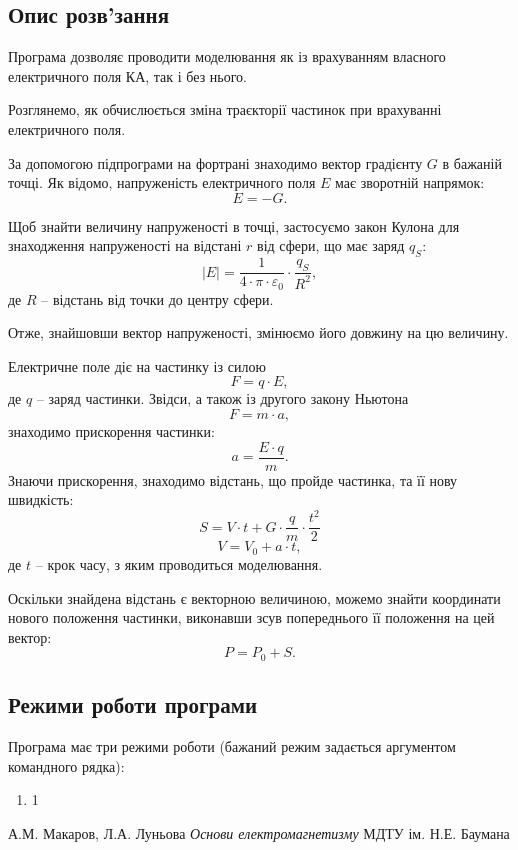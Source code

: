 \documentclass[a4paper,12pt]{article}
\begin{document}
\subsection{Опис розв’зання}
Програма дозволяє проводити моделювання як із врахуванням власного електричного поля КА, так і без нього.

Розглянемо, як обчислюється зміна траєкторії частинок при врахуванні електричного поля.

За допомогою підпрограми на фортрані знаходимо вектор градієнту $G$ в бажаній точці. Як відомо, напруженість електричного поля $E$ має зворотній напрямок:
\[
E = -G.
\]

Щоб знайти величину напруженості в точці, застосуємо закон Кулона для знаходження напруженості на відстані $r$ від сфери, що має заряд $q_S$:
\[
|E| = \frac{1}{4 \cdot \pi \cdot \varepsilon_0} \cdot \frac{q_S}{R^2},
\]
де $R$ -- відстань від точки до центру сфери.

Отже, знайшовши вектор напруженості, змінюємо його довжину на цю величину.

Електричне поле діє на частинку із силою
\[
F = q \cdot E,
\]
де $q$ -- заряд частинки.
Звідси, а також із другого закону Ньютона
\[
F = m \cdot a,
\]
знаходимо прискорення частинки:
\[
a = \frac{E \cdot q}{m}.
\]
Знаючи прискорення, знаходимо відстань, що пройде частинка, та її нову швидкість:
\[
S = V \cdot t + G \cdot \frac{q}{m} \cdot \frac{t^2}{2}
\]
\[
V = V_{0} + a \cdot t,
\]
де $t$ -- крок часу, з яким проводиться моделювання.

Оскільки знайдена відстань є векторною величиною, можемо знайти координати нового положення частинки, виконавши зсув попереднього її положення на цей вектор:
\[
P = P_0 + S.
\]

\subsection{Режими роботи програми}
Програма має три режими роботи (бажаний режим задається аргументом командного рядка):
\begin{enumerate}
\item 1
\end{enumerate}



\begin{thebibliography}{9}

    А.М. Макаров, Л.А. Луньова
    \emph{Основи електромагнетизму}
    МДТУ ім. Н.Е. Баумана  
      


\end{thebibliography}
\end{document}

